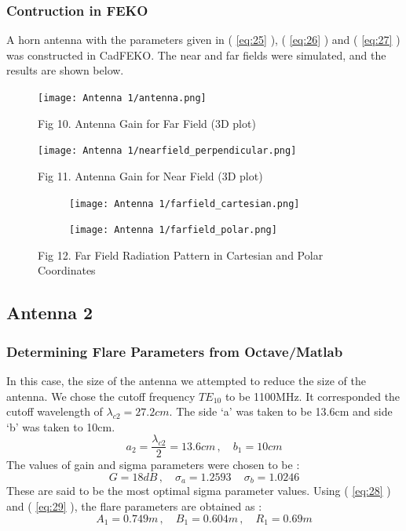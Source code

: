 \documentclass[12pt]{article}
\newcommand*{\myref}[1]{%
  \begingroup
    \hypersetup{
      linkcolor=linkequation,
      linkbordercolor=linkequation,
    }%
    \ref{#1}%
  \endgroup
}
\begin{document}
\subsubsection{Contruction in FEKO}
A horn antenna with the parameters given in (\myref{eq:25}), (\myref{eq:26}) and (\myref{eq:27}) was constructed in CadFEKO. The near and far fields were simulated, and the results are shown below. 
\begin{figure}[H]
  \centering
  \texttt{[image: Antenna 1/antenna.png]}
  \caption{Fig 10. Antenna Gain for Far Field (3D plot)}
\end{figure}
\begin{figure}[H]
  \centering
  \texttt{[image: Antenna 1/nearfield\_perpendicular.png]}
  \caption{Fig 11. Antenna Gain for Near Field (3D plot)}
\end{figure}
\begin{figure} [H]
  \begin{subfigure}[b]{0.6\textwidth}
      \centering
      \texttt{[image: Antenna 1/farfield\_cartesian.png]}
  \end{subfigure}%
  \begin{subfigure}[b]{0.65\textwidth}
      \centering
      \texttt{[image: Antenna 1/farfield\_polar.png]}
  \end{subfigure}
  \caption{Fig 12. Far Field Radiation Pattern in Cartesian and Polar Coordinates}
\end{figure}
\subsection{Antenna 2}
\subsubsection{Determining Flare Parameters from Octave/Matlab}
In this case, the size of the antenna we attempted to reduce the size of the antenna. \linebreak
We chose the cutoff frequency $TE_{10}$ to be 1100MHz. It corresponded the cutoff wavelength of $\lambda_{c2}=27.2cm$. \linebreak
The side `a' was taken to be 13.6cm and side `b' was taken to 10cm. 
\begin{equation}
  a_2=\dfrac{\lambda_{c2}}{2}=13.6cm \, , \quad b_1=10cm \label{eq:28}
\end{equation}
The values of gain and sigma parameters were chosen to be :
\begin{equation}
  G=18dB\, , \quad \sigma_a=1.2593 \, \quad \sigma_b=1.0246 \label{eq:29}
\end{equation}
These are said to be the most optimal sigma parameter values. \linebreak
Using (\myref{eq:28}) and (\myref{eq:29}), the flare parameters are obtained as :
\begin{equation}
  A_1=0.749m \, , \quad B_1=0.604m \, , \quad R_1=0.69m \label{eq:30}
\end{equation}
\end{document}
